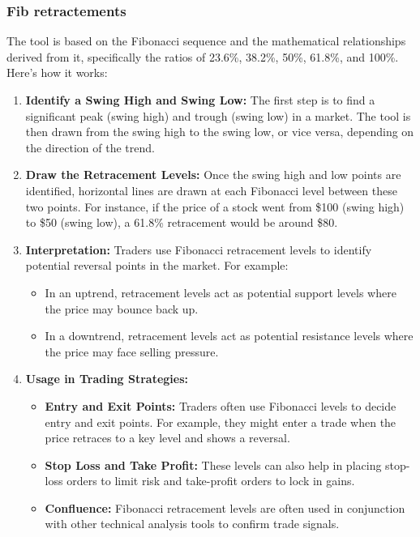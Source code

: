 \documentclass{report}
\begin{document}
     \subsubsection{Fib retractements}
     \bigbreak \noindent 
     The tool is based on the Fibonacci sequence and the mathematical relationships derived from it, specifically the ratios of 23.6\%, 38.2\%, 50\%, 61.8\%, and 100\%. Here's how it works:
     \bigbreak \noindent 
     \begin{enumerate}
         \item \textbf{Identify a Swing High and Swing Low:} The first step is to find a significant peak (swing high) and trough (swing low) in a market. The tool is then drawn from the swing high to the swing low, or vice versa, depending on the direction of the trend.
         \item \textbf{Draw the Retracement Levels:} Once the swing high and low points are identified, horizontal lines are drawn at each Fibonacci level between these two points. For instance, if the price of a stock went from \$100 (swing high) to \$50 (swing low), a 61.8\% retracement would be around \$80.
         \item \textbf{Interpretation:} Traders use Fibonacci retracement levels to identify potential reversal points in the market. For example:
             \begin{itemize}
                 \item In an uptrend, retracement levels act as potential support levels where the price may bounce back up.
                 \item In a downtrend, retracement levels act as potential resistance levels where the price may face selling pressure.
             \end{itemize}
         \item \textbf{Usage in Trading Strategies:}
             \begin{itemize}
                 \item \textbf{Entry and Exit Points:} Traders often use Fibonacci levels to decide entry and exit points. For example, they might enter a trade when the price retraces to a key level and shows a reversal.
                 \item \textbf{Stop Loss and Take Profit:} These levels can also help in placing stop-loss orders to limit risk and take-profit orders to lock in gains.
                 \item \textbf{Confluence:} Fibonacci retracement levels are often used in conjunction with other technical analysis tools to confirm trade signals.
             \end{itemize}
     \end{enumerate} 
     \bigbreak \noindent 
\end{document}
